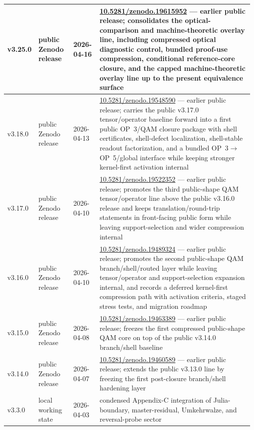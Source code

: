{\begin{longtable}{|p{}|p{}|p{}|p{}|}
\hline
v3.25.0 & public Zenodo release & 2026-04-16 & \href{https://doi.org/10.5281/zenodo.19615952}{10.5281/zenodo.19615952} --- earlier public release; consolidates the optical-comparison and machine-theoretic overlay line, including compressed optical diagnostic control, bundled proof-use compression, conditional reference-core closure, and the capped machine-theoretic overlay line up to the present equivalence surface \\ 
\hline
v3.18.0 & public Zenodo release & 2026-04-13 & \href{https://doi.org/10.5281/zenodo.19548590}{10.5281/zenodo.19548590} --- earlier public release; carries the public v3.17.0 tensor/operator baseline forward into a first public OP~3/QAM closure package with shell certificates, shell-defect localization, shell-stable readout factorization, and a bundled OP~3$\to$OP~5/global interface while keeping stronger kernel-first activation internal \\
\hline
v3.17.0 & public Zenodo release & 2026-04-10 & \href{https://doi.org/10.5281/zenodo.19522352}{10.5281/zenodo.19522352} --- earlier public release; promotes the third public-shape QAM tensor/operator line above the public v3.16.0 release and keeps translation/round-trip statements in front-facing public form while leaving support-selection and wider compression internal \\
\hline
v3.16.0 & public Zenodo release & 2026-04-10 & \href{https://doi.org/10.5281/zenodo.19489324}{10.5281/zenodo.19489324} --- earlier public release; promotes the second public-shape QAM branch/shell/routed layer while leaving tensor/operator and support-selection expansion internal, and records a deferred kernel-first compression path with activation criteria, staged stress tests, and migration roadmap \\
\hline
v3.15.0 & public Zenodo release & 2026-04-08 & \href{https://doi.org/10.5281/zenodo.19463389}{10.5281/zenodo.19463389} --- earlier public release; freezes the first compressed public-shape QAM core on top of the public v3.14.0 branch/shell baseline \\
\hline
v3.14.0 & public Zenodo release & 2026-04-07 & \href{https://doi.org/10.5281/zenodo.19460589}{10.5281/zenodo.19460589} --- earlier public release; extends the public v3.13.0 line by freezing the first post-closure branch/shell hardening layer \\
\hline
v3.3.0 & local working state & 2026-04-03 & condensed Appendix-C integration of Julia-boundary, master-residual, Umkehrwalze, and reversal-probe sector \\

\end{longtable}}
